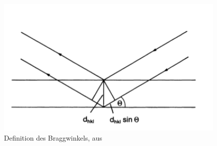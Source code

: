 \begin{figure}
    \includegraphics[width=1.0\textwidth]{pics/Bragg_Winkel}
    \caption{Definition des Braggwinkels,
aus \cite{ibach2009festkorperphysik} }
    \label{fig:Bragg_Winkel}
\end{figure}


